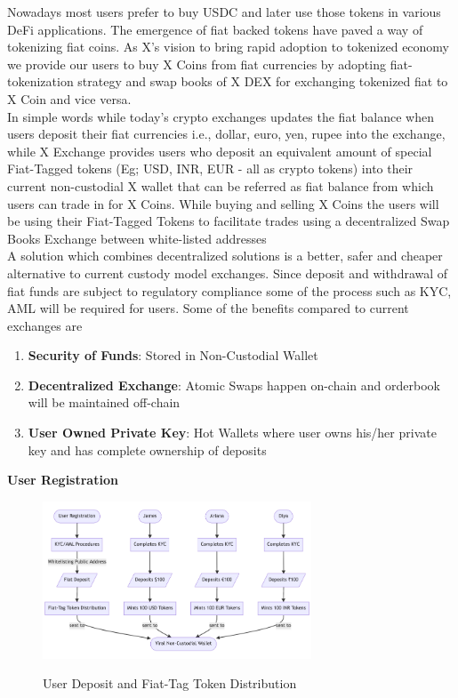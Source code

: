 \documentclass[letterpaper,11pt]{article}
\begin{document}
Nowadays most users prefer to buy USDC and later use those tokens in various DeFi applications. The emergence of fiat backed tokens have paved a way of tokenizing fiat coins. As X's vision to bring rapid adoption to tokenized economy we provide our users to buy X Coins from fiat currencies by adopting fiat-tokenization strategy and swap books of X DEX for exchanging tokenized fiat to X Coin and vice versa.\\

In simple words while today's crypto exchanges updates the fiat balance when users deposit their fiat currencies i.e., dollar, euro, yen, rupee into the exchange, while X Exchange provides users who deposit an equivalent amount of special Fiat-Tagged tokens (Eg; USD, INR, EUR - all as crypto tokens) into their current non-custodial X wallet that can be referred as fiat balance from which users can trade in for X Coins. While buying and selling X Coins the users will be using their Fiat-Tagged Tokens to facilitate trades using a decentralized Swap Books Exchange between white-listed addresses\\

A solution which combines decentralized solutions is a better, safer and cheaper alternative to current custody model exchanges. Since deposit and withdrawal of fiat funds are subject to regulatory compliance some of the process such as KYC, AML will be required for users. Some of the benefits compared to current exchanges are
\begin{enumerate}[wide, labelwidth=!, labelindent=0pt]
\item \textbf{Security of Funds}: Stored in Non-Custodial Wallet
\item \textbf{Decentralized Exchange}: Atomic Swaps happen on-chain and orderbook will be maintained off-chain
\item \textbf{User Owned Private Key}: Hot Wallets where user owns his/her private key and has complete ownership of deposits
\end{enumerate}

\textbf{User Registration}\\

\begin{figure}[H]
\begin{center}
\includegraphics[width=8cm]{user-deposit}\\
\caption{User Deposit and Fiat-Tag Token Distribution}
\end{center}
\end{figure}
\end{document}

